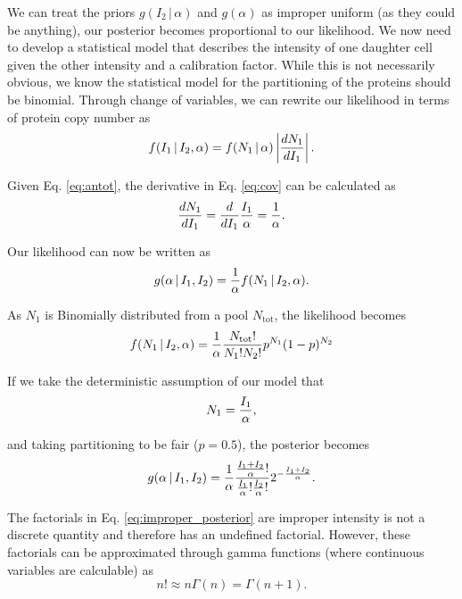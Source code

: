 We can treat the priors $g(I_2 \,\vert\, \alpha)$ and $g(\alpha)$ as improper
uniform (as they could be anything), our posterior becomes proportional to our
likelihood. We now need to develop a statistical model that describes the
intensity of one daughter cell given the other intensity and a calibration
factor. While this is not necessarily obvious, we know the statistical model
for the partitioning of the proteins should be binomial. Through change of
variables, we can rewrite our likelihood in terms of protein copy number as
\begin{equation}
f(I_1\,\vert\, I_2, \alpha) = f(N_1\,\vert\, \alpha) \left\vert {dN_1 \over dI_1} \right\vert.
\label{eq:cov}
\end{equation}

Given Eq. \ref{eq:antot}, the derivative in Eq. \ref{eq:cov} can be calculated as
\begin{equation}
{dN_1 \over dI_1} = {d \over dI_1} {I_1 \over \alpha} = {1 \over \alpha}.
\end{equation}

Our likelihood can now be written as
\begin{equation}
g(\alpha\,\vert\, I_1, I_2) = {1 \over \alpha} f(N_1\,\vert\, I_2, \alpha).
\end{equation}

As $N_1$ is Binomially distributed from a pool $N_\text{tot}$,  the likelihood becomes
\begin{equation}
f(N_1 \,\vert\, I_2, \alpha) = {1\over \alpha}{N_\text{tot}! \over N_1! N_2!}p^{N_1}(1 - p)^{N_2}
\label{eq:bayes_binom}
\end{equation}

If we take the deterministic assumption of our model that
\begin{equation}
N_1 = {I_1 \over \alpha},
\end{equation}

and taking partitioning to be fair ($p = 0.5$), the posterior becomes
\begin{equation}
g(\alpha\,\vert\,I_1, I_2) = {1 \over \alpha}{{I_1 + I_2 \over \alpha}! \over {I_1 \over \alpha}! {I_2 \over \alpha}!}2^{-{I_1 + I_2 \over \alpha}}.
\label{eq:improper_posterior}
\end{equation}

The factorials in Eq. \ref{eq:improper_posterior} are improper intensity is not
a discrete quantity and therefore has an undefined factorial. However, these
factorials can be approximated through gamma functions (where continuous variables
are calculable) as
\begin{equation}
n! \approx n\Gamma(n) = \Gamma(n + 1).
\label{eq:gamma_approx}
\end{equation}

